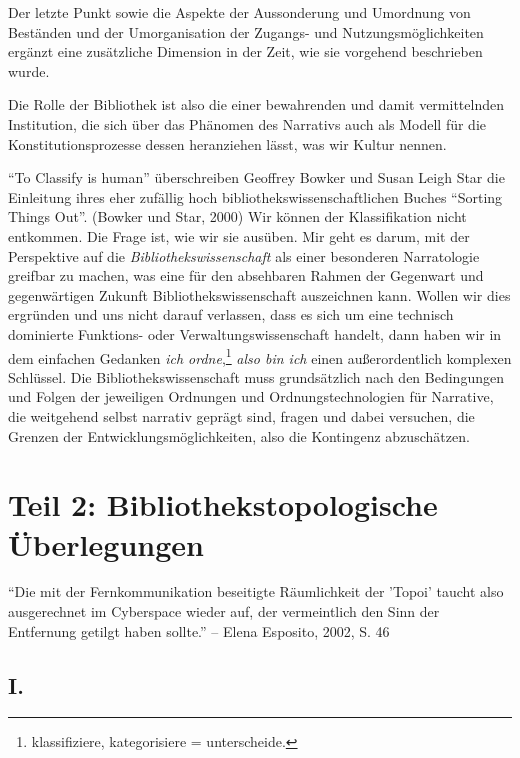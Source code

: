 \documentclass[output=paper]{langscibook}
\begin{document}
\noindent Der letzte Punkt sowie die Aspekte der Aussonderung und Umordnung von
Beständen und der Umorganisation der Zugangs- und Nutzungsmöglichkeiten
ergänzt eine zusätzliche Dimension in der Zeit, wie sie vorgehend
beschrieben wurde.

Die Rolle der Bibliothek ist also die einer bewahrenden und damit
vermittelnden Institution, die sich über das Phänomen des Narrativs auch
als Modell für die Konstitutionsprozesse dessen heranziehen lässt, was
wir Kultur nennen.

\enquote{To Classify is human} überschreiben Geoffrey Bowker und Susan
Leigh Star die Einleitung ihres eher zufällig hoch
bibliothekswissenschaftlichen Buches \enquote{Sor\-ting Things Out}.
(Bowker und Star, 2000) Wir können der Klassifikation nicht entkommen.
Die Frage ist, wie wir sie ausüben. Mir geht es darum, mit der
Perspektive auf die \emph{Bibliothekswissenschaft} als einer besonderen
Narratologie greifbar zu machen, was eine für den absehbaren Rahmen der
Gegenwart und gegenwärtigen Zukunft Bibliothekswissenschaft auszeichnen
kann. Wollen wir dies ergründen und uns nicht darauf verlassen, dass es
sich um eine technisch dominierte Funktions- oder
Verwaltungswissenschaft handelt, dann haben wir in dem einfachen
Gedanken \emph{ich ordne},\footnote{klassifiziere, kategorisiere =
  unterscheide.} \emph{also bin ich} einen außerordentlich komplexen
Schlüssel. Die Bibliothekswissenschaft muss grundsätzlich nach den
Bedingungen und Folgen der jeweiligen Ordnungen und Ordnungstechnologien
für Narrative, die weitgehend selbst narrativ geprägt sind, fragen und
dabei versuchen, die Grenzen der Entwicklungsmöglichkeiten, also die
Kontingenz abzuschätzen.

\hypertarget{teil-2-bibliothekstopologische-uxfcberlegungen}{%
\section*{Teil 2: Bibliothekstopologische
Überlegungen}\label{teil-2-bibliothekstopologische-uxfcberlegungen}}

\enquote{Die mit der Fernkommunikation beseitigte Räumlichkeit der
'Topoi' taucht also ausgerechnet im Cyberspace wieder auf, der
vermeintlich den Sinn der Entfernung getilgt haben sollte.} -- Elena
Esposito, 2002, S. 46

\hypertarget{i.}{%
\subsection*{I.}\label{i.}}
\end{document}
